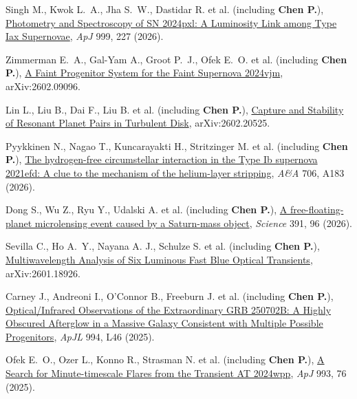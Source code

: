 \item Singh M., Kwok L.~A., Jha S.~W., Dastidar R. et al. (including \textbf{Chen P.}), \href{https://ui.adsabs.harvard.edu/abs/2026ApJ...999..227S}{Photometry and Spectroscopy of SN 2024pxl: A Luminosity Link among Type Iax Supernovae}, \textit{ApJ} 999, 227 (2026).

\item Zimmerman E.~A., Gal-Yam A., Groot P.~J., Ofek E.~O. et al. (including \textbf{Chen P.}), \href{https://ui.adsabs.harvard.edu/abs/2026arXiv260209096Z}{A Faint Progenitor System for the Faint Supernova 2024vjm}, arXiv:2602.09096.

\item Lin L., Liu B., Dai F., Liu B. et al. (including \textbf{Chen P.}), \href{https://ui.adsabs.harvard.edu/abs/2026arXiv260220525L}{Capture and Stability of Resonant Planet Pairs in Turbulent Disk}, arXiv:2602.20525.

\item Pyykkinen N., Nagao T., Kuncarayakti H., Stritzinger M. et al. (including \textbf{Chen P.}), \href{https://ui.adsabs.harvard.edu/abs/2026A&A...706A.183P}{The hydrogen-free circumstellar interaction in the Type Ib supernova 2021efd: A clue to the mechanism of the helium-layer stripping}, \textit{A\&A} 706, A183 (2026).

\item Dong S., Wu Z., Ryu Y., Udalski A. et al. (including \textbf{Chen P.}), \href{https://ui.adsabs.harvard.edu/abs/2026Sci...391...96D}{A free-floating-planet microlensing event caused by a Saturn-mass object}, \textit{Science} 391, 96 (2026).

\item Sevilla C., Ho A.~Y., Nayana A. J., Schulze S. et al. (including \textbf{Chen P.}), \href{https://ui.adsabs.harvard.edu/abs/2026arXiv260118926S}{Multiwavelength Analysis of Six Luminous Fast Blue Optical Transients}, arXiv:2601.18926.

\item Carney J., Andreoni I., O'Connor B., Freeburn J. et al. (including \textbf{Chen P.}), \href{https://ui.adsabs.harvard.edu/abs/2025ApJ...994L..46C}{Optical/Infrared Observations of the Extraordinary GRB 250702B: A Highly Obscured Afterglow in a Massive Galaxy Consistent with Multiple Possible Progenitors}, \textit{ApJL} 994, L46 (2025).

\item Ofek E.~O., Ozer L., Konno R., Strasman N. et al. (including \textbf{Chen P.}), \href{https://ui.adsabs.harvard.edu/abs/2025ApJ...993...76O}{A Search for Minute-timescale Flares from the Transient AT 2024wpp}, \textit{ApJ} 993, 76 (2025).

